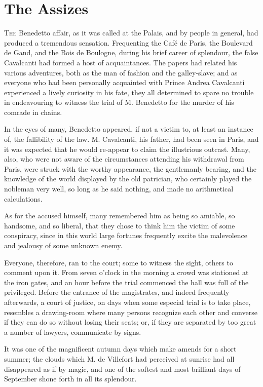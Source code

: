 \chapter{The Assizes} 

 \lettrine{T}{he} Benedetto affair, as it was called at the Palais, and by people in general, had produced a tremendous sensation. Frequenting the Café de Paris, the Boulevard de Gand, and the Bois de Boulogne, during his brief career of splendour, the false Cavalcanti had formed a host of acquaintances. The papers had related his various adventures, both as the man of fashion and the galley-slave; and as everyone who had been personally acquainted with Prince Andrea Cavalcanti experienced a lively curiosity in his fate, they all determined to spare no trouble in endeavouring to witness the trial of M. Benedetto for the murder of his comrade in chains. 

 In the eyes of many, Benedetto appeared, if not a victim to, at least an instance of, the fallibility of the law. M. Cavalcanti, his father, had been seen in Paris, and it was expected that he would re-appear to claim the illustrious outcast. Many, also, who were not aware of the circumstances attending his withdrawal from Paris, were struck with the worthy appearance, the gentlemanly bearing, and the knowledge of the world displayed by the old patrician, who certainly played the nobleman very well, so long as he said nothing, and made no arithmetical calculations. 

 As for the accused himself, many remembered him as being so amiable, so handsome, and so liberal, that they chose to think him the victim of some conspiracy, since in this world large fortunes frequently excite the malevolence and jealousy of some unknown enemy. 

 Everyone, therefore, ran to the court; some to witness the sight, others to comment upon it. From seven o'clock in the morning a crowd was stationed at the iron gates, and an hour before the trial commenced the hall was full of the privileged. Before the entrance of the magistrates, and indeed frequently afterwards, a court of justice, on days when some especial trial is to take place, resembles a drawing-room where many persons recognize each other and converse if they can do so without losing their seats; or, if they are separated by too great a number of lawyers, communicate by signs. 

 It was one of the magnificent autumn days which make amends for a short summer; the clouds which M. de Villefort had perceived at sunrise had all disappeared as if by magic, and one of the softest and most brilliant days of September shone forth in all its splendour. 


